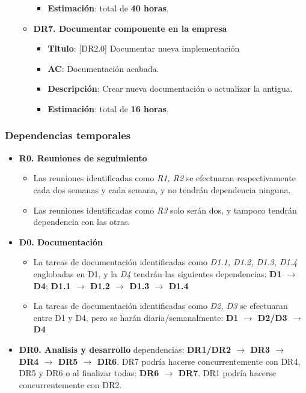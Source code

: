 \documentclass[12pt]{article}
\begin{document}
\begin{itemize}
\begin{itemize}
\begin{itemize}
                    \item \textbf{Estimación}: total de \textbf{40 horas}.
                \end{itemize}   
            \item \textbf{DR7. Documentar componente en la empresa}
                \begin{itemize}
                    \item \textbf{Titulo}: [DR2.0] Documentar nueva implementación
                    \item \textbf{AC}: Documentación acabada.
                    \item \textbf{Descripción}: Crear nueva documentación o actualizar la antigua.
                    \item \textbf{Estimación}: total de \textbf{16 horas}.
                \end{itemize}                
        \end{itemize}
    \end{itemize}
     \subsubsection{Dependencias temporales}
     
      \begin{itemize}
        \item \textbf{R0. Reuniones de seguimiento}
            \begin{itemize}
                \item Las reuniones identificadas como \textit{R1, R2} se efectuaran respectivamente cada dos semanas y cada semana, y no tendrán dependencia ninguna.
                \item Las reuniones identificadas como \textit{R3} solo serán dos, y tampoco tendrán dependencia con las otras.
            \end{itemize}
        \item \textbf{D0. Documentación}
            \begin{itemize}
                \item La tareas de documentación identificadas como \textit{D1.1, D1.2, D1.3, D1.4} englobadas en D1, y la \textit{D4} tendrán las siguientes dependencias: \textbf{D1 $\rightarrow$ D4}; \textbf{D1.1 $\rightarrow$ D1.2 $\rightarrow$ D1.3 $\rightarrow$ D1.4} 
                \item La tareas de documentación identificadas como \textit{D2, D3} se efectuaran entre D1 y D4, pero se harán diaria/semanalmente: \textbf{D1 $\rightarrow$ D2/D3 $\rightarrow$ D4}
            \end{itemize}
        \item \textbf{DR0. Analisis y desarrollo} dependencias: \textbf{DR1/DR2 $\rightarrow$ DR3 $\rightarrow$ DR4 $\rightarrow$ DR5 $\rightarrow$ DR6}. DR7 podría hacerse concurrentemente con DR4, DR5 y DR6 o al finalizar todas: \textbf{DR6 $\rightarrow$ DR7}. DR1 podría hacerse concurrentemente con DR2.
    \end{itemize}
    \clearpage
\end{document}
